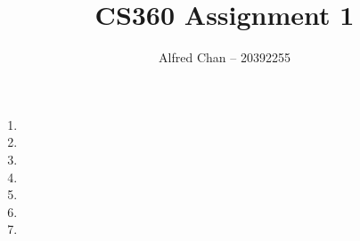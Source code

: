 \documentclass[12pt]{article}
\title{CS360 Assignment 1}
\author{Alfred Chan -- 20392255}
\begin{document}
\maketitle

\begin{enumerate}
\item
\item
\item
\item
\item
\item
\item
\end{enumerate}
\end{document}
